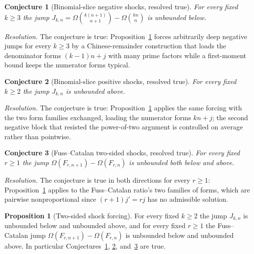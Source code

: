 \documentclass[11pt]{article}
\newtheorem{conjecture}{Conjecture}
\theoremstyle{definition}
\newtheorem{proposition}{Proposition}
\begin{document}
\begin{conjecture}[Binomial-slice negative shocks, resolved true]\label{w14}
For every fixed $k\ge3$ the jump $J_{k,n}=\Omega\binom{k(n+1)}{n+1}-\Omega\binom{kn}{n}$ is unbounded below.
\end{conjecture}

\emph{Resolution.} The conjecture is true: Proposition~\ref{w:shock} forces arbitrarily deep negative jumps for every $k\ge3$ by a Chinese-remainder construction that loads the denominator forms $(k-1)n+j$ with many prime factors while a first-moment bound keeps the numerator forms typical.

\begin{conjecture}[Binomial-slice positive shocks, resolved true]\label{w15}
For every fixed $k\ge2$ the jump $J_{k,n}$ is unbounded above.
\end{conjecture}

\emph{Resolution.} The conjecture is true: Proposition~\ref{w:shock} applies the same forcing with the two form families exchanged, loading the numerator forms $kn+j$; the second negative block that resisted the power-of-two argument is controlled on average rather than pointwise.

\begin{conjecture}[Fuss--Catalan two-sided shocks, resolved true]\label{w16}
For every fixed $r\ge1$ the jump $\Omega(F_{r,n+1})-\Omega(F_{r,n})$ is unbounded both below and above.
\end{conjecture}

\emph{Resolution.} The conjecture is true in both directions for every $r\ge1$: Proposition~\ref{w:shock} applies to the Fuss--Catalan ratio's two families of forms, which are pairwise nonproportional since $(r+1)j'=rj$ has no admissible solution.

\begin{proposition}[Two-sided shock forcing]\label{w:shock}
For every fixed $k\ge2$ the jump $J_{k,n}$ is unbounded below and unbounded above, and for every fixed $r\ge1$ the Fuss--Catalan jump $\Omega(F_{r,n+1})-\Omega(F_{r,n})$ is unbounded below and unbounded above.  In particular Conjectures~\ref{w14}, \ref{w15}, and~\ref{w16} are true.
\end{proposition}
\end{document}
